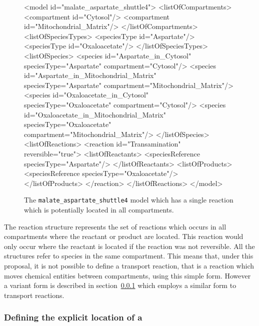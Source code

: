 \documentclass{cekarticle}
\begin{document}
\begin{figure}[h]
\begin{example}
<model id="malate_aspartate_shuttle4">
    <listOfCompartments>
        <compartment id="Cytosol"/>
        <compartment id="Mitochondrial_Matrix"/>
    </listOfCompartments>
    <listOfSpeciesTypes>
        <speciesType id="Aspartate"/>
        <speciesType id="Oxaloacetate"/>
    </listOfSpeciesTypes>
    <listOfSpecies>
        <species
            id="Aspartate_in_Cytosol"
            speciesType="Aspartate"
            compartment="Cytosol"/>
        <species
            id="Aspartate_in_Mitochondrial_Matrix"
            speciesType="Aspartate"
            compartment="Mitochondrial_Matrix"/>
        <species
            id="Oxaloacetate_in_Cytosol"
            speciesType="Oxaloacetate"
            compartment="Cytosol"/>
        <species
            id="Oxaloacetate_in_Mitochondrial_Matrix"
            speciesType="Oxaloacetate"
            compartment="Mitochondrial_Matrix"/>
    </listOfSpecies>
    <listOfReactions>
        <reaction id="Transamination" reversible="true">
            <listOfReactants>
                <speciesReference speciesType="Aspartate"/>
            </listOfReactants>
            <listOfProducts>
                <speciesReference speciesType="Oxaloacetate"/>
            </listOfProducts>
        </reaction>
    </listOfReactions>
</model>
\end{example}
\caption{The \texttt{malate\_aspartate\_shuttle4} model which has a single reaction which is potentially
located in all compartments.} 
\label{fig:malate_aspartate_shuttle4-xml}
\end{figure}

The reaction structure represents the set of reactions which occurs in all compartments where 
the reactant or product are located.  This reaction would only occur where the reactant is located
if the reaction was not reversible.  All the  structures refer to 
species in the same compartment.  This means that, under this proposal, it is not possible to define
a transport reaction, that is a reaction which moves chemical entities between compartments,
using this simple form.  However a variant form is described in
section~\ref{sec:locatedspeciesreferences} which employs a similar form to transport reactions.

\subsubsection{Defining the explicit location of a }
\label{sec:locatedspeciesreferences}
\end{document}
